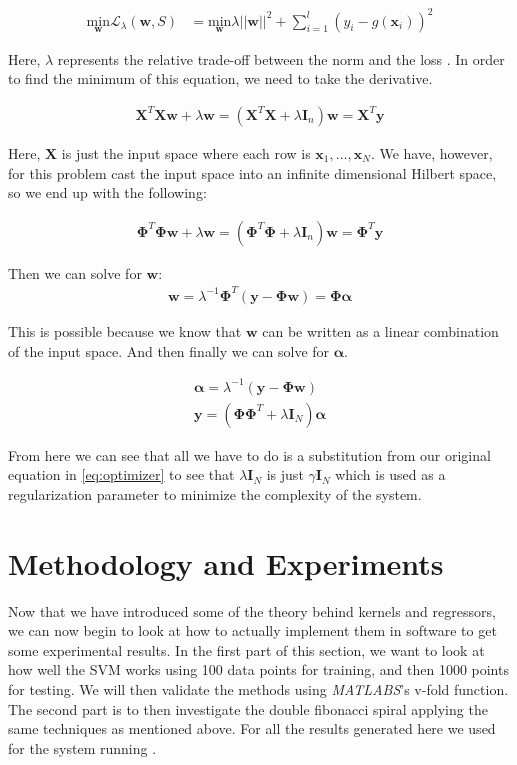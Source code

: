 \documentclass[11pt, twoside]{article}   	%
\begin{document}
\begin{align*}
\underset{\mathbf{w}}{\text{min}} \mathbf{\mathcal{L}}_\lambda (\mathbf{w}, S) &= 
\underset{\mathbf{w}}{\text{min}} \lambda ||\mathbf{w}||^2 + \sum_{i=1}^{l}(y_i - g(\mathbf{x}_i))^2
\end{align*}

Here, $\lambda$ represents the relative trade-off between the norm and the loss \cite{kernelmethods}. In order to find the minimum of this equation, 
we need to take the derivative. 

\begin{align*}
\mathbf{X}^T\mathbf{X}\mathbf{w} + \lambda\mathbf{w} = (\mathbf{X}^T\mathbf{X} + \lambda \mathbf{I}_n)\mathbf{w} = \mathbf{X}^T\mathbf{y}
\end{align*}

Here, $\mathbf{X}$ is just the input space where each row is $\mathbf{x}_1, \ldots, \mathbf{x}_N$. We have, however, for this problem
cast the input space into an infinite dimensional Hilbert space, so we end up with the following: 

\begin{align*}
\mathbf{\Phi}^T\mathbf{\Phi}\mathbf{w} + \lambda\mathbf{w} = (\mathbf{\Phi}^T\mathbf{\Phi} + \lambda \mathbf{I}_n)\mathbf{w} = \mathbf{\Phi}^T\mathbf{y}
\end{align*}

Then we can solve for $\mathbf{w}$: 
\begin{align*}
\mathbf{w} = \lambda^{-1} \mathbf{\Phi}^T (\mathbf{y} - \mathbf{\Phi} \mathbf{w}) = \mathbf{\Phi}\mathbf{\alpha}
\end{align*}

This is possible because we know that $\mathbf{w}$ can be written as a linear combination of the input space. And then finally we can solve
for $\mathbf{\alpha}$.

\begin{align*}
\bm{\alpha} = \lambda^{-1}(\mathbf{y} - \mathbf{\Phi} \mathbf{w}) \\
\mathbf{y} = (\mathbf{\Phi \Phi}^T + \lambda\mathbf{I}_N)\mathbf{\alpha}
\end{align*}

From here we can see that all we have to do is a substitution from our original equation in \ref{eq:optimizer} to see that
$\lambda\bm{I}_N$ is just $\gamma\bm{I}_N$ which is used as a regularization parameter to minimize the complexity 
of the system. 

\section{Methodology and Experiments}
Now that we have introduced some of the theory behind kernels and regressors, we can now begin to look at how to 
actually implement them in software to get some experimental results. 
In the first part of this section, we want to look at how well the SVM works using
100 data points for training, and then 1000 points for testing. We will
then validate the methods using \textit{MATLABS}'s v-fold function. The
second part is to then investigate the double fibonacci spiral applying
the same techniques as mentioned above. For all the results generated here
we used  for the system running
.
\end{document}

